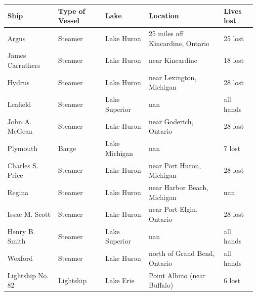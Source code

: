 \documentclass{article}
\begin{document}
\begin{tabular}{lllll}
\toprule
Ship & Type of Vessel & Lake & Location & Lives lost \\
\midrule
Argus & Steamer & Lake Huron & 25 miles off Kincardine, Ontario & 25 lost \\
James Carruthers & Steamer & Lake Huron & near Kincardine & 18 lost \\
Hydrus & Steamer & Lake Huron & near Lexington, Michigan & 28 lost \\
Leafield & Steamer & Lake Superior & nan & all hands \\
John A. McGean & Steamer & Lake Huron & near Goderich, Ontario & 28 lost \\
Plymouth & Barge & Lake Michigan & nan & 7 lost \\
Charles S. Price & Steamer & Lake Huron & near Port Huron, Michigan & 28 lost \\
Regina & Steamer & Lake Huron & near Harbor Beach, Michigan & nan \\
Issac M. Scott & Steamer & Lake Huron & near Port Elgin, Ontario & 28 lost \\
Henry B. Smith & Steamer & Lake Superior & nan & all hands \\
Wexford & Steamer & Lake Huron & north of Grand Bend, Ontario & all hands \\
Lightship No. 82 & Lightship & Lake Erie & Point Albino (near Buffalo) & 6 lost \\
\bottomrule
\end{tabular}
\end{document}
